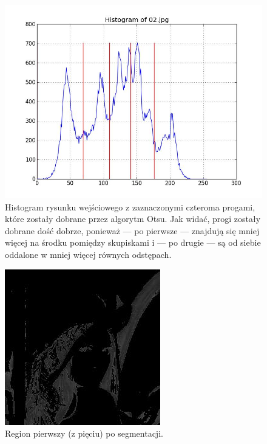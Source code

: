 \documentclass[10pt]{llncs}
\begin{document}
\FloatBarrier

\begin{figure}[h!]
  \centering
  \includegraphics[scale=.3, clip]{img/02_histogram.jpg}
	\caption[]
  {Histogram rysunku wejściowego z zaznaczonymi czteroma progami, które zostały dobrane przez algorytm Otsu. Jak widać, progi zostały dobrane dość dobrze, ponieważ --- po pierwsze --- znajdują się mniej więcej na środku pomiędzy skupiskami i --- po drugie --- są od siebie oddalone w mniej więcej równych odstępach.}
\end{figure}

\FloatBarrier

\begin{figure}[h!]
  \centering
  \includegraphics[scale=.8, clip]{img/02_region_01.jpg}
	\caption[]
  {Region pierwszy (z pięciu) po segmentacji.}
\end{figure}

\FloatBarrier
\end{document}
